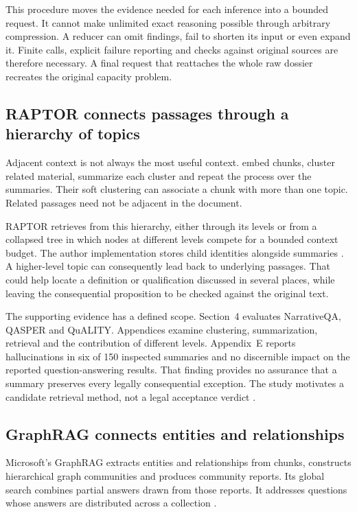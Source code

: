 This procedure moves the evidence needed for each inference into a bounded
request. It cannot make unlimited exact reasoning possible through arbitrary
compression. A reducer can omit findings, fail to shorten its input or even
expand it. Finite calls, explicit failure reporting and checks against original
sources are therefore necessary. A final request that reattaches the whole
raw dossier recreates the original capacity problem.

\subsection{RAPTOR connects passages through a hierarchy of topics}

Adjacent context is not always the most useful context.
\citet[sec.~3]{raptor2024} embed chunks, cluster related material, summarize
each cluster and repeat the process over the summaries. Their soft clustering
can associate a chunk with more than one topic. Related passages need not be
adjacent in the document.

RAPTOR retrieves from this hierarchy, either through its levels or from a
collapsed tree in which nodes at different levels compete for a bounded
context budget. The author implementation stores child identities alongside
summaries \citep{raptorcode2026}. A higher-level topic can consequently lead
back to underlying passages. That could help locate a definition or
qualification discussed in several places, while leaving the consequential
proposition to be checked against the original text.

The supporting evidence has a defined scope. Section~4 evaluates NarrativeQA,
QASPER and QuALITY. Appendices examine clustering, summarization, retrieval
and the contribution of different levels. Appendix~E reports hallucinations
in six of 150 inspected summaries and no discernible impact on the reported
question-answering results. That finding provides no assurance that a summary
preserves every legally consequential exception. The study motivates a
candidate retrieval method, not a legal acceptance verdict
\citep[sec.~4 and Apps.~B--F, I]{raptor2024}.

\subsection{GraphRAG connects entities and relationships}

Microsoft's GraphRAG extracts entities and relationships from chunks,
constructs hierarchical graph communities and produces community reports.
Its global search combines partial answers drawn from those reports. It
addresses questions whose answers are distributed across a collection
\citep[sec.~3]{graphrag2025}.

